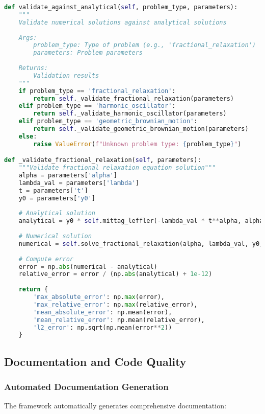 \begin{lstlisting}[language=Python, caption=Analytical Validation]
def validate_against_analytical(self, problem_type, parameters):
    """
    Validate numerical solutions against analytical solutions
    
    Args:
        problem_type: Type of problem (e.g., 'fractional_relaxation')
        parameters: Problem parameters
    
    Returns:
        Validation results
    """
    if problem_type == 'fractional_relaxation':
        return self._validate_fractional_relaxation(parameters)
    elif problem_type == 'harmonic_oscillator':
        return self._validate_harmonic_oscillator(parameters)
    elif problem_type == 'geometric_brownian_motion':
        return self._validate_geometric_brownian_motion(parameters)
    else:
        raise ValueError(f"Unknown problem type: {problem_type}")

def _validate_fractional_relaxation(self, parameters):
    """Validate fractional relaxation equation solution"""
    alpha = parameters['alpha']
    lambda_val = parameters['lambda']
    t = parameters['t']
    y0 = parameters['y0']
    
    # Analytical solution
    analytical = y0 * self.mittag_leffler(-lambda_val * t**alpha, alpha, 1)
    
    # Numerical solution
    numerical = self.solve_fractional_relaxation(alpha, lambda_val, y0, t)
    
    # Compute error
    error = np.abs(numerical - analytical)
    relative_error = error / (np.abs(analytical) + 1e-12)
    
    return {
        'max_absolute_error': np.max(error),
        'max_relative_error': np.max(relative_error),
        'mean_absolute_error': np.mean(error),
        'mean_relative_error': np.mean(relative_error),
        'l2_error': np.sqrt(np.mean(error**2))
    }
\end{lstlisting}

\subsection{Documentation and Code Quality}

\subsubsection{Automated Documentation Generation}

The framework automatically generates comprehensive documentation:

